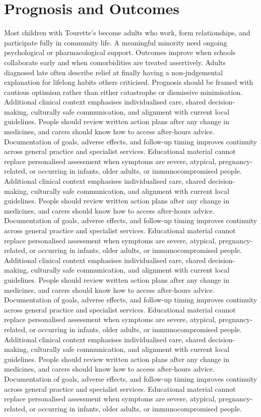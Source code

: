 \section*{Prognosis and Outcomes}
Most children with Tourette's become adults who work, form relationships, and participate fully in community life. A meaningful minority need ongoing psychological or pharmacological support. Outcomes improve when schools collaborate early and when comorbidities are treated assertively. Adults diagnosed late often describe relief at finally having a non-judgemental explanation for lifelong habits others criticised. Prognosis should be framed with cautious optimism rather than either catastrophe or dismissive minimisation. Additional clinical context emphasises individualised care, shared decision-making, culturally safe communication, and alignment with current local guidelines. People should review written action plans after any change in medicines, and carers should know how to access after-hours advice. Documentation of goals, adverse effects, and follow-up timing improves continuity across general practice and specialist services. Educational material cannot replace personalised assessment when symptoms are severe, atypical, pregnancy-related, or occurring in infants, older adults, or immunocompromised people. Additional clinical context emphasises individualised care, shared decision-making, culturally safe communication, and alignment with current local guidelines. People should review written action plans after any change in medicines, and carers should know how to access after-hours advice. Documentation of goals, adverse effects, and follow-up timing improves continuity across general practice and specialist services. Educational material cannot replace personalised assessment when symptoms are severe, atypical, pregnancy-related, or occurring in infants, older adults, or immunocompromised people. Additional clinical context emphasises individualised care, shared decision-making, culturally safe communication, and alignment with current local guidelines. People should review written action plans after any change in medicines, and carers should know how to access after-hours advice. Documentation of goals, adverse effects, and follow-up timing improves continuity across general practice and specialist services. Educational material cannot replace personalised assessment when symptoms are severe, atypical, pregnancy-related, or occurring in infants, older adults, or immunocompromised people. Additional clinical context emphasises individualised care, shared decision-making, culturally safe communication, and alignment with current local guidelines. People should review written action plans after any change in medicines, and carers should know how to access after-hours advice. Documentation of goals, adverse effects, and follow-up timing improves continuity across general practice and specialist services. Educational material cannot replace personalised assessment when symptoms are severe, atypical, pregnancy-related, or occurring in infants, older adults, or immunocompromised people.

